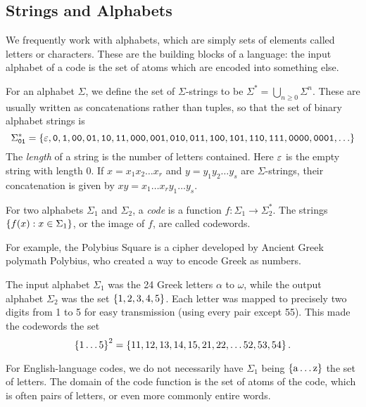 \documentclass{article}
\begin{document}
\subsection{Strings and Alphabets}

We frequently work with alphabets, which are simply sets of elements called letters or characters. These are the building blocks of a language: the input alphabet of a code is the set of atoms which are encoded into something else.

\begin{definition}
	\label{string-concatenation-length}
	For an alphabet $\Sigma$, we define the set of $\Sigma$-strings to be $\Sigma^* = \bigcup_{n \geq 0} \Sigma^n$. These are usually written as concatenations rather than tuples, so that the set of binary alphabet strings is
	\[
	\Sigma_\texttt{01}^* = \set{\eps, \texttt{0}, \texttt{1}, \texttt{00}, \texttt{01}, \texttt{10}, \texttt{11}, \texttt{000}, \texttt{001}, \texttt{010}, \texttt{011}, \texttt{100}, \texttt{101}, \texttt{110}, \texttt{111}, \texttt{0000}, \texttt{0001}, \dots }
	\]
	The \textit{length} of a string is the number of letters contained. Here $\varepsilon$ is the empty string with length 0. If $x = x_1x_2\dots x_r$ and $y = y_1 y_2\dots y_s$ are $\Sigma$-strings, their concatenation is given by $xy=x_1 \dots x_r y_1 \dots y_s$.
\end{definition}

For two alphabets $\Sigma_1$ and $\Sigma_2$, a \textit{code} is a function $f: \Sigma_1 \to \Sigma_2^*$. The strings $\left\lbrace f(x): x \in \Sigma_1 \right\rbrace$, or the image of $f$, are called codewords.

\begin{example}
	\label{polybius-square-example}
    For example, the Polybius Square is a cipher developed by Ancient Greek polymath Polybius, who created a way to encode Greek as numbers.
    
    The input alphabet $\Sigma_1$ was the 24 Greek letters $\alpha$ to $\omega$, while the output alphabet $\Sigma_2$ was the set $\left\lbrace 1, 2, 3, 4, 5 \right\rbrace$. Each letter was mapped to precisely two digits from 1 to 5 for easy transmission (using every pair except 55). This made the codewords the set
    \[
	\left\lbrace 1 \dots 5 \right\rbrace^2 = \left\lbrace 11, 12, 13, 14, 15, 21, 22, \dots 52, 53, 54 \right\rbrace.
	\]
\end{example}

\begin{note}
	 For English-language codes, we do not necessarily have $\Sigma_1$ being $\left\lbrace \mathrm{a} \dots \mathrm{z} \right\rbrace$ the set of letters. The domain of the code function is the set of atoms of the code, which is often pairs of letters, or even more commonly entire words.
\end{note}
\end{document}
